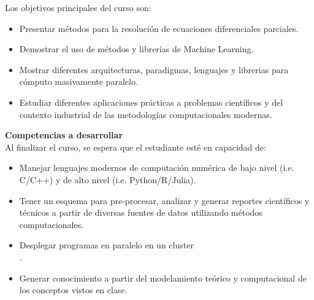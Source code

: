 \documentclass[letterpaper,10pt,onecolumn]{article}
\begin{document}
\noindent\normalsize Los objetivos principales del curso son:

\begin{itemize}

        \item Presentar m\'etodos para la resoluci\'on de ecuaciones
          diferenciales parciales. \\[-0.6cm] 
        \item Demostrar el uso de m\'etodos y librer\'ias de Machine
          Learning. \\[-0.6cm]
        \item Mostrar diferentes arquitecturas, paradigmas, lenguajes
          y librerias para c\'omputo masivamente paralelo.  \\[-0.6cm]
	\item Estudiar diferentes aplicaciones prácticas a problemas
          científicos y del contexto industrial de las metodologías
          computacionales modernas. \\[-0.6cm] 
\end{itemize}

\noindent\textbf{\large {} \quad Competencias a
  desarrollar}\\[-0.2cm] 


\noindent\normalsize Al finalizar el curso, se espera que el
estudiante est\'e en capacidad de: 

\begin{itemize}
\item Manejar lenguajes modernos de computación numérica de
  bajo nivel (i.e. C/C++) y de alto nivel
  (i.e. Python/R/Julia). \\[-0.6cm]
\item Tener un esquema para pre-procesar, analizar y generar
  reportes científicos y técnicos a partir de diversas fuentes
  de datos utilizando métodos computacionales. \\[-0.6cm] 
\item Desplegar programas en paralelo en un cluster \\[-0.6cm].
\item Generar conocimiento a partir del modelamiento te\'orico
  y computacional de los conceptos vistos en clase.\\[-0.2cm]  
\end{itemize}
\end{document}
